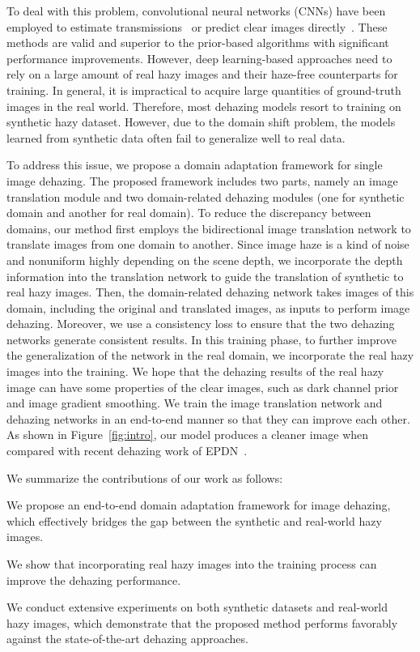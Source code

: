 \documentclass[10pt,twocolumn,letterpaper]{article}
\begin{document}
To deal with this problem, convolutional neural networks (CNNs) have been employed
to estimate transmissions~\cite{Cai2016DehazeNet, ren2016single, Zhang_2018_CVPR} or predict clear images directly~\cite{li2017aod, Ren_2018_CVPR, Li_2018_CVPR, qu2019enhanced}.
These methods are valid and superior to the prior-based algorithms with significant performance improvements.
However, deep learning-based approaches need to rely on a large amount of real hazy images and their haze-free counterparts for training.
In general, it is impractical to acquire large quantities of ground-truth images in the real world. 
Therefore, most dehazing models resort to training on synthetic hazy dataset.
However, due to the domain shift problem, the models learned from synthetic data often fail to generalize well to real data.

To address this issue, we propose a domain adaptation framework for single image dehazing.
The proposed framework includes two parts, namely an image translation module and two domain-related dehazing modules (one for synthetic domain and another for real domain).
To reduce the discrepancy between domains, our method first employs the bidirectional image translation network to translate images from one domain to another.
Since image haze is a kind of noise and nonuniform highly depending on the scene depth, we incorporate the depth information into the translation network to guide the translation of synthetic to real hazy images.
Then, the domain-related dehazing network takes images of this domain, including the original and translated images, as inputs to perform image dehazing.
Moreover, we use a consistency loss to ensure that the two dehazing networks generate consistent results. 
In this training phase, to further improve the generalization of the network in the real domain, we incorporate the real hazy images into the training.
We hope that the dehazing results of the real hazy image can have some properties of the clear images, such as dark channel prior and image gradient smoothing.
We train the image translation network and dehazing networks in an end-to-end manner so that they can improve each other.
As shown in Figure~\ref{fig:intro}, our model produces a cleaner image when compared with recent dehazing work of EPDN~\cite{qu2019enhanced}.

We summarize the contributions of our work as follows:
\vspace{-3mm}
\begin{compactitem}
\item We propose an end-to-end domain adaptation framework for image dehazing, which effectively bridges the gap between the synthetic and real-world hazy images.
\item We show that incorporating real hazy images into the training process can improve the dehazing performance. 
\item We conduct extensive experiments on both synthetic datasets and real-world hazy images, which demonstrate that the proposed method performs favorably against the state-of-the-art dehazing approaches.
\end{compactitem}
\end{document}
